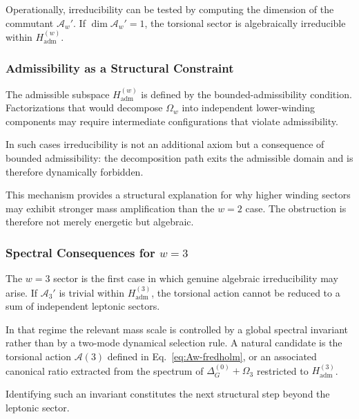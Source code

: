     Operationally, irreducibility can be tested by computing the
    dimension of the commutant $\mathcal{A}_w'$.
    If $\dim \mathcal{A}_w' = 1$, the torsional sector is algebraically
    irreducible within $H_{\mathrm{adm}}^{(w)}$.

  \subsubsection*{Admissibility as a Structural Constraint}

    The admissible subspace $H_{\mathrm{adm}}^{(w)}$ is defined by the
    bounded-admissibility condition.
    Factorizations that would decompose $\Omega_w$ into independent
    lower-winding components may require intermediate configurations
    that violate admissibility.

    In such cases irreducibility is not an additional axiom but a
    consequence of bounded admissibility:
    the decomposition path exits the admissible domain and is therefore
    dynamically forbidden.

    This mechanism provides a structural explanation for why higher
    winding sectors may exhibit stronger mass amplification than the
    $w=2$ case.
    The obstruction is therefore not merely energetic but algebraic.

  \subsubsection*{Spectral Consequences for $w=3$}

    The $w=3$ sector is the first case in which genuine algebraic
    irreducibility may arise.
    If $\mathcal{A}_3'$ is trivial within $H_{\mathrm{adm}}^{(3)}$,
    the torsional action cannot be reduced to a sum of independent
    leptonic sectors.

    In that regime the relevant mass scale is controlled by a global
    spectral invariant rather than by a two-mode dynamical selection rule.
    A natural candidate is the torsional action
    \(
    \mathcal{A}(3)
    \)
    defined in Eq.~\eqref{eq:Aw-fredholm}, or an associated canonical
    ratio extracted from the spectrum of
    \(
    \Delta^{(0)}_G+\Omega_3
    \)
    restricted to $H_{\mathrm{adm}}^{(3)}$.

    Identifying such an invariant constitutes the next structural step
    beyond the leptonic sector.
